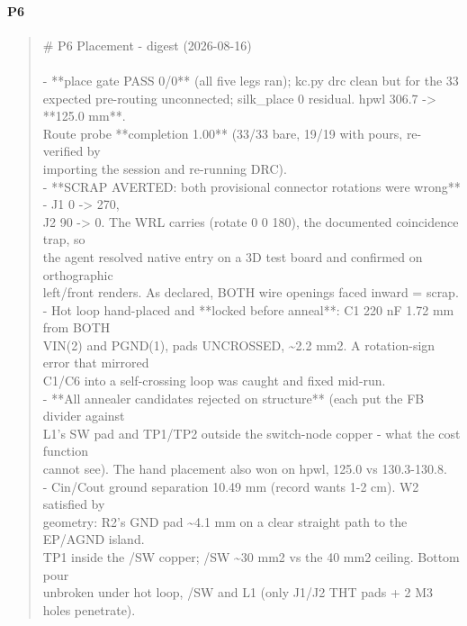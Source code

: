\documentclass[11pt,a4paper]{article}
\begin{document}
\paragraph*{P6}
\begin{quote}\small\ttfamily\raggedright
\# P6 Placement - digest (2026-08-16)\\
~\\
- {*}{*}place gate PASS 0/0{*}{*} (all five legs ran); kc.py drc clean but for the 33\\
  expected pre-routing unconnected; silk\_place 0 residual. hpwl 306.7 -\textgreater{} {*}{*}125.0 mm{*}{*}.\\
  Route probe {*}{*}completion 1.00{*}{*} (33/33 bare, 19/19 with pours, re-verified by\\
  importing the session and re-running DRC).\\
- {*}{*}SCRAP AVERTED: both provisional connector rotations were wrong{*}{*} - J1 0 -\textgreater{} 270,\\
  J2 90 -\textgreater{} 0. The WRL carries (rotate 0 0 180), the documented coincidence trap, so\\
  the agent resolved native entry on a 3D test board and confirmed on orthographic\\
  left/front renders. As declared, BOTH wire openings faced inward = scrap.\\
- Hot loop hand-placed and {*}{*}locked before anneal{*}{*}: C1 220 nF 1.72 mm from BOTH\\
  VIN(2) and PGND(1), pads UNCROSSED, \textasciitilde{}2.2 mm2. A rotation-sign error that mirrored\\
  C1/C6 into a self-crossing loop was caught and fixed mid-run.\\
- {*}{*}All annealer candidates rejected on structure{*}{*} (each put the FB divider against\\
  L1's SW pad and TP1/TP2 outside the switch-node copper - what the cost function\\
  cannot see). The hand placement also won on hpwl, 125.0 vs 130.3-130.8.\\
- Cin/Cout ground separation 10.49 mm (record wants 1-2 cm). W2 satisfied by\\
  geometry: R2's GND pad \textasciitilde{}4.1 mm on a clear straight path to the EP/AGND island.\\
  TP1 inside the /SW copper; /SW \textasciitilde{}30 mm2 vs the 40 mm2 ceiling. Bottom pour\\
  unbroken under hot loop, /SW and L1 (only J1/J2 THT pads + 2 M3 holes penetrate).\\

\end{quote}
\end{document}
